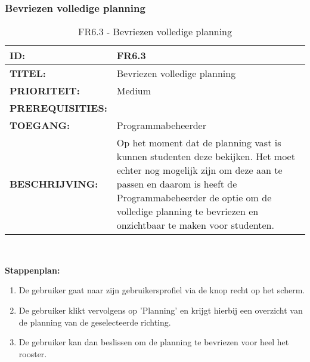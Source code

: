 \subsubsection{Bevriezen volledige planning}
\noindent\begin{table}[H]
            \begin{tabular}{l | p{10cm}}
                \textbf{ID:} & FR6.3 \\ \hline
                \textbf{TITEL:} & Bevriezen volledige planning\\ \hline
                \textbf{PRIORITEIT:} &  Medium \\ \hline
                \textbf{PREREQUISITIES:} & \\ \hline
                \textbf{TOEGANG:} & Programmabeheerder \\ \hline
                \textbf{BESCHRIJVING:} & Op het moment dat de planning vast is kunnen studenten deze bekijken. Het moet echter nog mogelijk zijn om deze aan te passen en daarom is heeft de Programmabeheerder de optie om de volledige planning te bevriezen en onzichtbaar te maken voor studenten.\\ 
            \end{tabular}\\
            \caption{FR6.3 - Bevriezen volledige planning}
            \label{tab:FR6.3 - Bevriezen volledige planning}
        \end{table}   

\textbf{Stappenplan:}
	\begin{enumerate}
	\item De gebruiker gaat naar zijn gebruikersprofiel via de knop recht op het scherm.
	\item De gebruiker klikt vervolgens op 'Planning' en krijgt hierbij een overzicht van de planning van de geselecteerde richting.
	\item De gebruiker kan dan beslissen om de planning te bevriezen voor heel het rooster.
	\end{enumerate}	


\clearpage